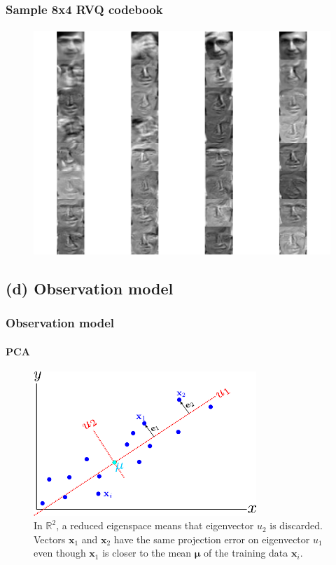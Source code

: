 \begin{frame}
\frametitle{Sample 8x4 RVQ codebook}
\framesubtitle{}
\logoCSIPCPL\mypagenum
\begin{figure}
\includegraphics[height=0.75\textheight]{thesis/1_Dudek__aRVQ_08_04_1000_0_RofE__170_codebook.pdf}
\end{figure}	
\end{frame}


\subsection{(d) Observation model}
\begin{frame}
\frametitle{Observation model}
\framesubtitle{PCA}
\logoCSIPCPL\mypagenum
\begin{figure}
\centering
\includegraphics[width=0.75\textwidth]{thesis/PRML_PCA_problem.pdf}
\caption{In $\mathbb{R}^2$, a reduced eigenspace means that eigenvector $u_2$ is discarded.  Vectors $\mathbf{x}_1$ and $\mathbf{x}_2$ have the same projection error on eigenvector $u_1$ even though $\mathbf{x}_1$ is closer to the mean $\boldsymbol\mu$ of the training data $\mathbf{x}_i$.}
\label{fig:PRML_PCA_problem}
\end{figure}
\end{frame}



